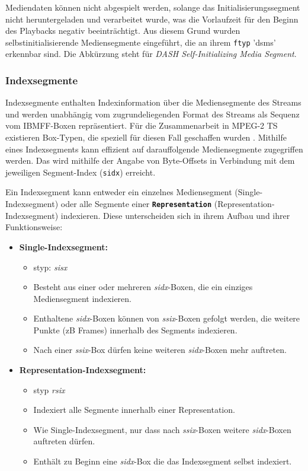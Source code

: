 \documentclass[paper = a4, fontsize = 12pt, parskip = half]{scrartcl} %
\def\attr#1{\texttt{#1}}
\def\elem#1{\texttt{\textbf{#1}}}
\begin{document}
Mediendaten können nicht abgespielt werden, solange das Initialisierungssegment nicht heruntergeladen und verarbeitet wurde, was die Vorlaufzeit für den Beginn des Playbacks negativ beeinträchtigt. Aus diesem Grund wurden selbstinitialisierende Mediensegmente eingeführt, die an ihrem \attr{ftyp} 'dsms' erkennbar sind. Die Abkürzung steht für \textit{DASH Self-Initializing Media Segment}.

\subsubsection{Indexsegmente}
Indexsegmente enthalten Indexinformation über die Mediensegmente des Streams und werden unabhängig vom zugrundeliegenden Format des Streams als Sequenz vom IBMFF-Boxen repräsentiert. Für die Zusammenarbeit in MPEG-2 TS existieren Box-Typen, die speziell für diesen Fall geschaffen wurden \cite{international_organization_for_standardization_isoiec_nodate}.
Mithilfe eines Indexsegments kann effizient auf darauffolgende Mediensegmente zugegriffen werden. Das wird mithilfe der Angabe von Byte-Offsets in Verbindung mit dem jeweiligen Segment-Index (\attr{sidx}) erreicht.

Ein Indexsegment kann entweder ein einzelnes Mediensegment (Single-Indexsegment) oder alle Segmente einer \elem{Representation} (Representation-Indexsegment) indexieren. Diese unterscheiden sich in ihrem Aufbau und ihrer Funktionsweise:

\begin{itemize}
	\item \textbf{Single-Indexsegment:} 
	\begin{itemize}
		\item styp: \textit{sisx}
		\item Besteht aus einer oder mehreren \textit{sidx}-Boxen, die ein einziges Mediensegment indexieren.
		\item Enthaltene \textit{sidx}-Boxen können von \textit{ssix}-Boxen gefolgt werden, die weitere Punkte (zB Frames) innerhalb des Segments indexieren.
		\item Nach einer \textit{ssix}-Box dürfen keine weiteren \textit{sidx}-Boxen mehr auftreten.
	\end{itemize}
	\item \textbf{Representation-Indexsegment:} 
	\begin{itemize}
		\item styp \textit{rsix}
		\item Indexiert alle Segmente innerhalb einer Representation.
		\item Wie Single-Indexsegment, nur dass nach \textit{ssix}-Boxen weitere \textit{sidx}-Boxen auftreten dürfen.
		\item Enthält zu Beginn eine \textit{sidx}-Box die das Indexsegment selbst indexiert.
	\end{itemize}
\end{itemize}
\end{document}
